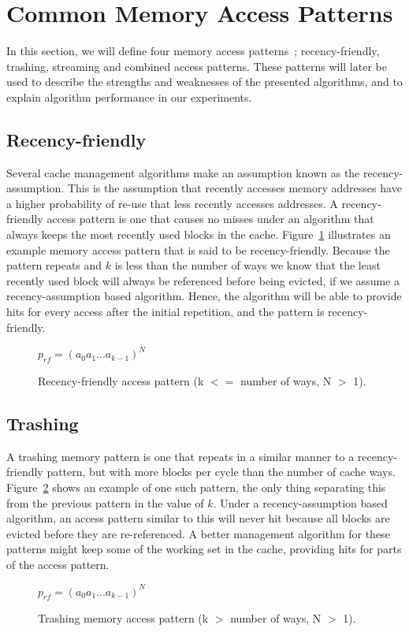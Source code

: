 \section{Common Memory Access Patterns}

In this section, we will define four memory access patterns~\cite{Jaleel2010}; recency-friendly, trashing, streaming and combined access patterns.
These patterns will later be used to describe the strengths and weaknesses of the presented algorithms, and to explain algorithm performance in our experiments.

\subsection{Recency-friendly}
Several cache management algorithms make an assumption known as the recency-assumption.
This is the assumption that recently accesses memory addresses have a higher probability of re-use that less recently accesses addresses.
A recency-friendly access pattern is one that causes no misses under an algorithm that always keeps the most recently used blocks in the cache.
Figure~\ref{fig:algorithms:rf_pattern} illustrates an example memory access pattern that is said to be recency-friendly.
Because the pattern repeats and $k$ is less than the number of ways we know that the least recently used block will always be referenced before being evicted, if we assume a recency-assumption based algorithm.
Hence, the algorithm will be able to provide hits for every access after the initial repetition, and the pattern is recency-friendly.

\begin{figure}[ht]
\centering
$p_{rf} = (a_0 a_1 ... a_{k-1})^N$
\caption[Recency-friendly access pattern.]{Recency-friendly access pattern (k $<=$ number of ways, N $>$ 1).}
\label{fig:algorithms:rf_pattern}
\end{figure}

\subsection{Trashing}
A trashing memory pattern is one that repeats in a similar manner to a recency-friendly pattern, but with more blocks per cycle than the number of cache ways. 
Figure~\ref{fig:algorithms:tr_pattern} shows an example of one such pattern, the only thing separating this from the previous pattern in the value of $k$.
Under a recency-assumption based algorithm, an access pattern similar to this will never hit because all blocks are evicted before they are re-referenced.
A better management algorithm for these patterns might keep some of the working set in the cache, providing hits for parts of the access pattern.
\begin{figure}[ht]
\centering
$p_{rf} = (a_0 a_1 ... a_{k-1})^N$
\caption[Trashing memory access pattern.]{Trashing memory access pattern (k $>$ number of ways, N $>$ 1).}
\label{fig:algorithms:tr_pattern}
\end{figure}

